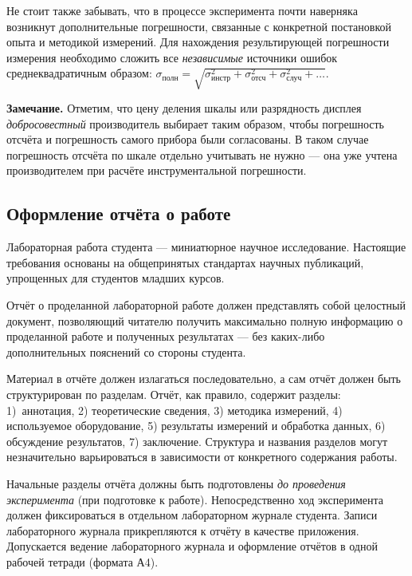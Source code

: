 \documentclass[10pt]{article}
\begin{document}
Не стоит также забывать, что в процессе эксперимента почти наверняка
возникнут дополнительные погрешности, связанные с конкретной постановкой
опыта и методикой измерений. Для нахождения результирующей погрешности
измерения необходимо сложить все \emph{независимые} источники ошибок
среднеквадратичным образом: $\sigma_{\text{полн}}=\sqrt{\sigma_{\text{инстр}}^{2}+
\sigma_{\text{отсч}}^{2}+\sigma_{\text{случ}}^{2}+\ldots}$. 

{\footnotesize
\textbf{Замечание.} Отметим, что цену деления шкалы
или разрядность дисплея \emph{добросовестный} производитель
выбирает таким образом, чтобы погрешность отсчёта и погрешность самого
прибора были согласованы. В таком случае погрешность отсчёта по шкале
отдельно учитывать не нужно --- она уже учтена производителем
при расчёте инструментальной погрешности.\par
}%

\subsection{Оформление отчёта о работе}

Лабораторная работа студента --- миниатюрное научное исследование.
Настоящие требования основаны на общепринятых стандартах научных публикаций,
упрощенных для студентов младших курсов.

Отчёт о проделанной лабораторной работе должен представлять собой
целостный документ, позволяющий читателю получить максимально полную
информацию о проделанной работе и полученных результатах ---
без каких-либо дополнительных пояснений со стороны студента.

Материал в отчёте должен излагаться последовательно, а сам отчёт должен
быть структурирован по разделам. Отчёт, как правило, содержит разделы:
1) аннотация, 2) теоретические сведения, 3) методика измерений, 4)
используемое оборудование, 5) результаты измерений и обработка данных,
6) обсуждение результатов, 7) заключение. Структура и названия разделов
могут незначительно варьироваться в зависимости от конкретного содержания
работы.

Начальные разделы отчёта должны быть подготовлены \emph{до проведения
эксперимента} (при подготовке к работе). Непосредственно ход эксперимента
должен фиксироваться в отдельном лабораторном журнале студента. Записи
лабораторного журнала прикрепляются к отчёту в качестве приложения.
Допускается ведение лабораторного журнала и оформление отчётов в одной
рабочей тетради (формата А4).
\end{document}

